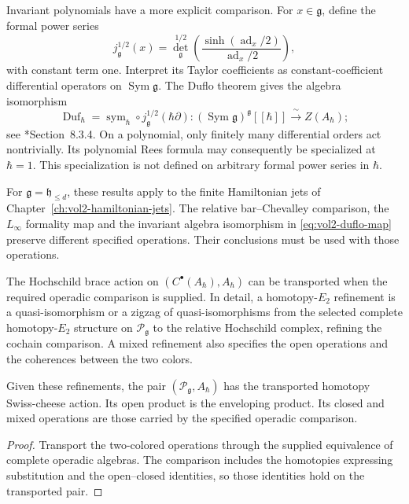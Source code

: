 Invariant polynomials have a more explicit comparison.
For $x\in\mathfrak g$, define the formal power series
\begin{equation}\label{eq:vol2-duflo-factor}
 j_{\mathfrak g}^{1/2}(x)
 =
 \det_{\mathfrak g}^{1/2}
 \left(
   \frac{\sinh(\operatorname{ad}_x/2)}
        {\operatorname{ad}_x/2}
 \right),
\end{equation}
with constant term one.
Interpret its Taylor coefficients as
constant-coefficient differential operators on
$\operatorname{Sym}\mathfrak g$.
The Duflo theorem gives the algebra isomorphism
\begin{equation}\label{eq:vol2-duflo-map}
 \operatorname{Duf}_\hbar
 =\operatorname{sym}_\hbar\circ
       j_{\mathfrak g}^{1/2}(\hbar\partial):
 (\operatorname{Sym}\mathfrak g)^{\mathfrak g}[[\hbar]]
 \xrightarrow{\ \sim\ } Z(A_\hbar);
\end{equation}
see \cite{KontsevichDQ}*{Section~8.3.4}.
On a polynomial, only finitely many differential
orders act nontrivially.
Its polynomial Rees formula may consequently be
specialized at $\hbar=1$.
This specialization is not defined on arbitrary
formal power series in $\hbar$.

For $\mathfrak g=\mathfrak h_{\leq d}$, these results
apply to the finite Hamiltonian jets of
Chapter~\ref{ch:vol2-hamiltonian-jets}.
The relative bar--Chevalley comparison, the
$L_\infty$ formality map and the invariant algebra
isomorphism in \eqref{eq:vol2-duflo-map} preserve
different specified operations.
Their conclusions must be used with those operations.

The Hochschild brace action on $(C^\bullet(A_\hbar),A_\hbar)$
can be transported when the required operadic comparison
is supplied. In detail, a homotopy-$E_2$ refinement is
a quasi-isomorphism or a zigzag of quasi-isomorphisms
from the selected complete homotopy-$E_2$ structure
on $\mathcal P_{\mathfrak g}$ to the relative
Hochschild complex, refining the cochain comparison.
A mixed refinement also specifies the open operations
and the coherences between the two colors.

\begin{corollary}
\label{cor:vol2-open-closed-refinement}
Given these refinements, the pair
$(\mathcal P_{\mathfrak g},A_\hbar)$ has the transported
homotopy Swiss-cheese action.
Its open product is the enveloping product.
Its closed and mixed operations are those carried by
the specified operadic comparison.
\end{corollary}
\begin{proof}
Transport the two-colored operations through the
supplied equivalence of complete operadic algebras.
The comparison includes the homotopies expressing
substitution and the open--closed identities, so
those identities hold on the transported pair.
\end{proof}

